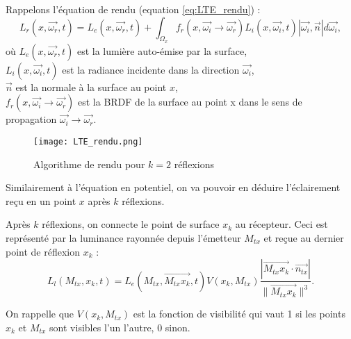 Rappelons l'équation de rendu (equation \ref{eq:LTE_rendu}) :
\large \begin{equation*}
    L_r(x, \overrightarrow{\omega_r}, t) =
        L_e(x, \overrightarrow{\omega_r}, t) +
        \int_{\Omega_x}
            f_r(x, \overrightarrow{\omega_i} \longrightarrow \overrightarrow{\omega_r})
            L_i(x, \overrightarrow{\omega_i}, t)
            |\overrightarrow{\omega_i}, \overrightarrow{n} |
        d\overrightarrow{\omega_i}
,\end{equation*} \normalsize
où $L_e(x, \overrightarrow{\omega_r}, t)$ est la lumière auto-émise par la surface, \\
$L_i(x, \overrightarrow{\omega_i}, t)$ est la radiance incidente dans la direction $\overrightarrow{\omega_i}$, \\
$\overrightarrow{n}$ est la normale à la surface au point $x$, \\
$f_r(x, \overrightarrow{\omega_i} \longrightarrow \overrightarrow{\omega_r})$ est la BRDF de la surface au point x dans le sens de propagation $\overrightarrow{\omega_i} \longrightarrow \overrightarrow{\omega_r}$.\newline\par

\begin{figure}[h!]\label{fig:LTE_rendu}
\centering
\texttt{[image: LTE\_rendu.png]}
\caption{Algorithme de rendu pour $k=2$ réflexions}
\end{figure}

Similairement à l'équation en potentiel, on va pouvoir en déduire l'éclairement reçu en un point $x$ après $k$ réflexions.\par
Après $k$ réflexions, on connecte le point de surface $x_k$ au récepteur. Ceci est représenté par la luminance rayonnée depuis l'émetteur $M_{tx}$ et reçue au dernier point de réflexion $x_k$ :
\large \begin{equation}
    L_l(M_{tx}, x_k, t) =
        L_e(M_{tx}, \overrightarrow{M_{tx}x_k}, t)
        V(x_k, M_{tx})
        \frac
            { | \overrightarrow{M_{tx}x_k}\cdot\overrightarrow{n_{tx}} | }
            { \| \overrightarrow{M_{tx}x_k} \| ^3}
.\end{equation} \normalsize \par
On rappelle que $V(x_k, M_{tx})$ est la fonction de visibilité qui vaut 1 si les points $x_k$ et $M_{tx}$ sont visibles l'un l'autre, 0 sinon.\newline\par

